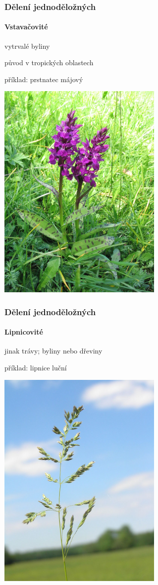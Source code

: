 \documentclass{beamer}
\begin{document}
\begin{frame}
\frametitle{Dělení jednoděložných}
\framesubtitle{Vstavačovité}
vytrvalé byliny

původ v tropických oblastech


příklad: prstnatec májový %

\begin{center}\includegraphics[width=8cm]{800px-Knabenkraut_2286.jpg}\end{center}

\end{frame}
\begin{frame}
\frametitle{Dělení jednoděložných}
\framesubtitle{Lipnicovité}
jinak trávy; byliny nebo dřeviny

příklad: lipnice luční %

\begin{center}\includegraphics[width=8cm]{800px-Poa_pratensis1.JPG}\end{center}

\end{frame}
\end{document}
